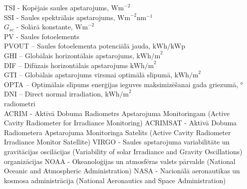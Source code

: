 \noindent TSI - Kopējais saules apstarojums, $\textrm{Wm}^{-2}$\\
SSI - Saules spektrālais apstarojums, $\textrm{Wm}^{-2}\textrm{nm}^{-1}$\\
$G_{sc}$ - Solārā konstante, $\textrm{Wm}^{-2}$\\
PV - Saules fotoelements\\ %
PVOUT – Saules fotoelementa potenciālā jauda, $\textrm{kWh/kWp}$\\ %
GHI – Globālais horizontālais apstarojums,  $\textrm{kWh/m}^2$\\ %
DIF – Difūzais horizontālais apstarojums  $\textrm{kWh/m}^2$\\ %
GTI – Globālais apstarojums virsmai optimālā slīpumā, $\textrm{kWh/m}^2$\\ %
OPTA – Optimālais slīpums enerģijas ieguves maksimizēšanai gada griezumā, °\\ %
DNI – Direct normal irradiation, $\textrm{kWh/m}^2$\\ %


radiometri\\
ACRIM - Aktīvā Dobuma Radiometrs Apstarojuma Monitoringam (Active Cavity Radiometer for Irradiance Monitoring)
ACRIMSAT - Aktīvā Dobuma Radiometera Apstarojuma Monitoringa Satelīts (Active Cavity Radiometer Irradiance Monitor Satellite) 
VIRGO - Saules apstarojuma variabilitāte un gravitācijas oscilācijas (Variability of solar Irradiance and Gravity Oscillations)
organizācijas
NOAA - Okeanoloģijas un atmosfēras valsts pārvalde (National Oceanic and Atmospheric Administration)
NASA - Nacionālā aeronautikas un kosmosa administrācija  (National Aeronautics and Space Administration)

